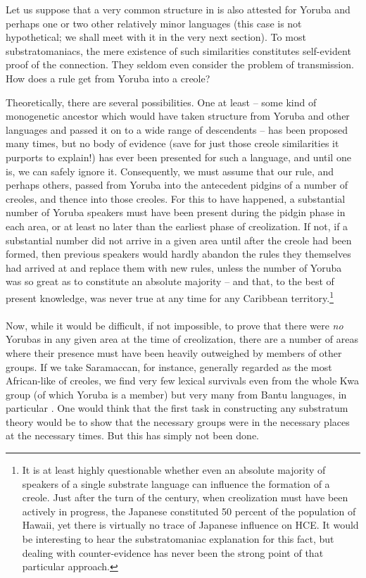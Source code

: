 Let us suppose that a very common structure in  is also attested for Yoruba and perhaps one or two other rela\-tively minor languages (this case is not hypothetical; we shall meet with it in the very next section). To most substratomaniacs, the mere existence of such similarities constitutes self-evident proof of the connection. They seldom even consider the problem of transmission. How does a rule get from Yoruba into a creole?

Theoretically, there are several possibilities. One at least -- some kind of monogenetic ancestor which would have taken structure from Yoruba and other languages and passed it on to a wide range of descen\-dents -- has been proposed many times, but no body of evidence (save for just those creole similarities it purports to explain!) has ever been presented for such a language, and until one is, we can safely ignore it. Consequently, we must assume that our rule, and perhaps others, passed from Yoruba into the antecedent pidgins of a number of creoles, and thence into those creoles. For this to have happened, a substantial number of Yoruba speakers must have been present during the pidgin
phase in each area, or at least no later than the earliest phase of creoli\-zation. If not, if a substantial number did not arrive in a given area until after the creole had been formed, then previous speakers would hardly abandon the rules they themselves had arrived at and replace them with new rules, unless the number of Yoruba was so great as to constitute an absolute majority -- and that, to the best of present knowledge, was never true at any time for any Caribbean territory.\footnote{It is at least highly questionable whether even an absolute majority of speakers of a single substrate language can influence the formation of a creole. Just after the turn of the century, when creolization must have been actively in progress, the Japanese constituted 50 percent of the population of Hawaii, yet there is virtually no trace of Japanese influence on HCE. It would be interesting to hear the substratomaniac explanation for this fact, but dealing with counter-evidence has never been the strong point of that particular approach.}\\\\

Now, while it would be difficult, if not impossible, to prove that there were \textit{no} Yorubas in any given area at the time of creolization, there are a number of areas where their presence must have been heavily outweighed by members of other groups. If we take Sara\-maccan, for instance, generally regarded as the most African-like of creoles, we find very few lexical survivals even from the whole Kwa group (of which Yoruba is a member) but very many from Bantu lan\-guages, in particular  \citep{Daeleman1972}. One would think that the first task in constructing any substratum theory would be to show that the necessary groups were in the necessary places at the necessary times. But this has simply not been done.

